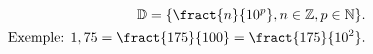\documentclass[preview]{standalone}
\begin{document}
\begin{align*}
\mathbb{D} = \{\fract{n}{10^p},n \in \mathbb{Z},p \in \mathbb{N}\}. \\ \text{Exemple: } 1,75 = \fract{175}{100} = \fract{175}{10^2}.
\end{align*}
\end{document}
